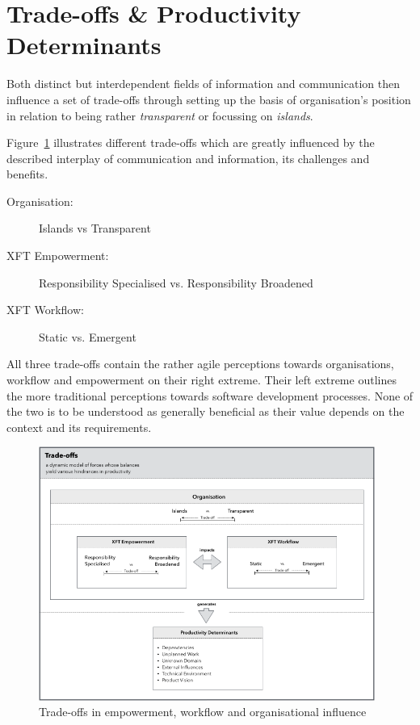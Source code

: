 \section{Trade-offs \& Productivity Determinants}

Both distinct but interdependent fields of information and communication then influence a set of trade-offs through setting up the basis of organisation's position in relation to being rather \emph{transparent} or focussing on \emph{islands}.

Figure~\ref{fig:trade-offs} illustrates different trade-offs which are greatly influenced by the described interplay of communication and information, its challenges and benefits.

\begin{description}
   \item[Organisation:] Islands vs Transparent
   \item[XFT Empowerment:] Responsibility Specialised vs. Responsibility Broadened
   \item[XFT Workflow:] Static vs. Emergent
\end{description}

All three trade-offs contain the rather agile perceptions towards organisations, workflow and empowerment on their right extreme. Their left extreme outlines the more traditional perceptions towards software development processes. None of the two is to be understood as generally beneficial as their value depends on the context and its requirements.

\begin{figure}[h!]
  \centering
  \includegraphics[width=0.98\textwidth]{figures/tradeoffs.png}
  \caption{Trade-offs in empowerment, workflow and organisational influence}
  \label{fig:trade-offs}
\end{figure}

